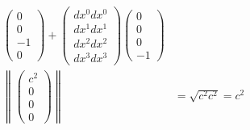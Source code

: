 \documentclass[pagesize,headsepline,10pt,parskip=half,BCOR=12mm]{scrreprt}
\begin{document}
\begin{align*}
\begin{pmatrix}
0\\
0\\
-1\\
0
\end{pmatrix} + \begin{pmatrix}
dx^0 dx^0\\
dx^1 dx^1\\
dx^2 dx^2\\
dx^3 dx^3
\end{pmatrix} \begin{pmatrix}
0\\
0\\
0\\
-1
\end{pmatrix}\\
\left\|\begin{pmatrix}
c^2\\
0\\
0\\
0
\end{pmatrix}\right\| &= \sqrt{c^2 c^2} = c^2
\end{align*}
\end{document}

